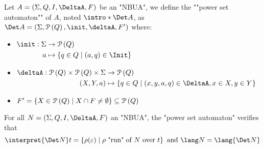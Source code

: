 \documentclass[a4paper,UKenglish,cleveref, autoref, thm-restate]{lipics-v2021}
\begin{document}
\begin{definition}
	\AP Let $A = \NBUA$ be an "NBUA", we define the ""power set automaton"" of $A$, noted $\intro* \Det A$, as
	$\Det A = (\Sigma, \parts Q, \init, \deltaA, F')$ where:

	\begin{itemize}
		\item $\begin{aligned}[t]
				      \init      : \Sigma & \to \parts Q                              \\
				      a                   & \mapsto \setdef{q \in Q}{(a,q) \in \Init}
			      \end{aligned} $

		\item $\begin{aligned}[t]
				      \deltaA               : \parts Q \times \parts Q \times \Sigma & \to \parts Q                                                      \\
				      (X, Y, a)                                                      & \mapsto \setdef{q \in Q}{(x,y,a,q) \in \DeltaA, x \in X, y \in Y}
			      \end{aligned}$

		\item $F' = \left\{X \in \mathcal{P}\left(Q\right) \mid X \cap F \neq \emptyset\right\} \subseteq \mathcal{P}\left(Q\right)$
	\end{itemize}
\end{definition}

\begin{theorem}\label{thm:determinisation}
	For all $N = \NBUA$ an "NBUA", the "power set automaton" verifies that
	\[
		\interpret {\Det N} t = \setdef {\rho(\varepsilon)}{\text{$\rho$ "run" of~$N$ over~$t$}} \text{ and } \lang N = \lang {\Det N}
	\]
\end{theorem}
\end{document}
